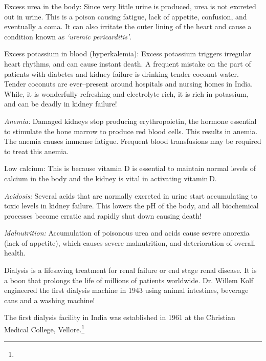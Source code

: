 { \item Excess urea in the body: Since very little urine is produced, urea is not excreted out in urine. This is a poison causing fatigue, lack of appetite, confusion, and eventually a coma. It can also irritate the outer lining of the heart and cause a condition known as \textit{‘uremic pericarditis’}.

 \item Excess potassium in blood (hyperkalemia): Excess potassium triggers irregular heart rhythms, and can cause instant death. A frequent mistake on the part of patients with diabetes and kidney failure is drinking tender coconut water. Tender coconuts are ever–present around hospitals and nursing homes in India. While, it is wonderfully refreshing and electrolyte rich, it is rich in potassium, and can be deadly in kidney failure!

 \item \textit{Anemia:} Damaged kidneys stop producing erythropoietin, the hormone essential to stimulate the bone marrow to produce red blood cells. This results in anemia. The anemia causes immense fatigue. Frequent blood transfusions may be required to treat this anemia.

 \item Low calcium: This is because vitamin D is essential to maintain normal levels of calcium in the body and the kidney is vital in activating vitamin D.

 \item \textit{Acidosis:} Several acids that are normally excreted in urine start accumulating to toxic levels in kidney failure. This lowers the pH of the body, and all biochemical processes become erratic and rapidly shut down causing death!

 \item \textit{Malnutrition:} Accumulation of poisonous urea and acids cause severe anorexia (lack of appetite), which causes severe malnutrition, and deterioration of overall health.


Dialysis is a lifesaving treatment for renal failure or end stage renal disease. It is a boon that prolongs the life of millions of patients worldwide. Dr. Willem Kolf engineered the first dialysis machine in 1943 using animal intestines, beverage cans and a washing machine!

The first dialysis facility in India was established in 1961 at the Christian Medical College, Vellore.\footnote{}

}
